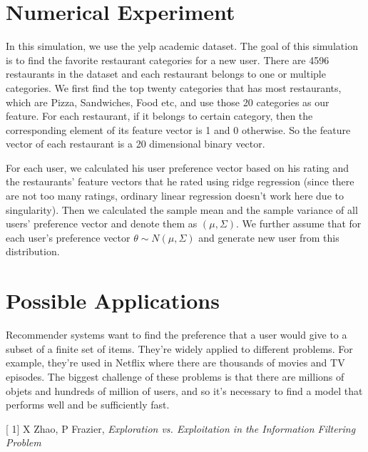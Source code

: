 \documentclass{article}
\renewenvironment{thebibliography}[1]{%
    \begin{oldthebibliography}{#1}%
      \setlength{\parskip}{.3ex}%
      \setlength{\itemsep}{.3ex}%
  }%
  {%
    \end{oldthebibliography}%
  }
\begin{document}
\section{Numerical Experiment}
In this simulation, we use the yelp academic dataset. The goal of this simulation is to find the favorite restaurant categories for a new user. There are 4596 restaurants in the dataset and each restaurant belongs to one or multiple categories. We first find the top twenty categories that has most restaurants, which are Pizza, Sandwiches, Food etc, and use those 20 categories as our feature. For each restaurant, if it belongs to certain category, then the corresponding element of its feature vector is 1 and 0 otherwise. So the feature vector of each restaurant is a 20 dimensional binary vector. 

For each user, we calculated his user preference vector based on his rating and the restaurants' feature vectors that he rated using ridge regression (since there are not too many ratings, ordinary linear regression doesn't work here due to singularity). Then we calculated the sample mean and the sample variance of all users' preference vector and denote them as $(\mu,\Sigma)$. We further assume that for each user's preference vector $\theta\sim N(\mu,\Sigma)$ and generate new user from this distribution.



\section{Possible Applications}

Recommender systems want to find the preference that a user would give to a subset of a finite set of items. They're widely applied to different problems. For example, they're used in Netflix where there are thousands of movies and TV episodes. The biggest challenge of these problems is that there are millions of objets and hundreds of million of users, and so it's necessary to find a model that performs well and be sufficiently fast.


\begin{thebibliography}[1]
X Zhao, P Frazier, \emph{Exploration vs. Exploitation in the Information Filtering Problem}
\end{thebibliography}
\end{document}
